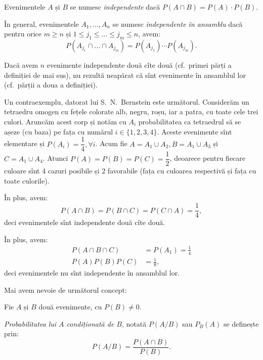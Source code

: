 \begin{definition}\label{def:ev-indep}
  Evenimentele $ A $ și $ B $ se numesc \emph{independente} dacă $ P(A \cap B) = P(A) \cdot P(B) $.

  În general, evenimentele $ A_1, \dots, A_n $ se numesc \emph{independente în ansamblu}
  dacă pentru orice $ m \geq n $ și $ 1 \leq j_1 \leq \dots \leq j_m \leq n $, avem:
  \[
    P(A_{j_1} \cap \dots \cap A_{j_m}) = P(A_{j_1}) \cdots P(A_{j_m}).
  \]
\end{definition}

\begin{remark}\label{rk:indep-ans}
  Dacă avem $ n $ evenimente independente două cîte două (cf.\ primei părți a definiției
  de mai sus), nu rezultă neapărat că sînt evenimente în ansamblul lor (cf.\ părții a
  doua a definiției).
\end{remark}

Un contraexemplu, datorat lui S.\ N.\ Bernstein este următorul. Considerăm un tetraedru
omogen cu fețele colorate alb, negru, roșu, iar a patra, cu toate cele trei culori.
Aruncăm acest corp și notăm cu $ A_i $ probabilitatea ca tetraedrul să se așeze (cu baza)
pe fața cu numărul $ i \in \{ 1, 2, 3, 4 \} $. Aceste evenimente sînt elementare și
$ P(A_i) = \dfrac{1}{4}, \forall i $. Acum fie $ A = A_1 \cup A_2, B = A_1 \cup A_3 $ și
$ C = A_1 \cup A_4 $. Atunci $ P(A) = P(B) = P(C) = \dfrac{1}{2} $, deoarece pentru fiecare
culoare sînt 4 cazuri posibile și 2 favorabile (fața cu culoarea respectivă și fața cu
toate culorile).

În plus, avem:
\[
  P(A \cap B) = P(B \cap C) = P(C \cap A) = \frac{1}{4},
\]
deci evenimentele sînt independente două cîte două.

În plus, avem:
\begin{align*}
  P(A \cap B \cap C) &= P(A_1) = \frac{1}{4} \\
  P(A)P(B)P(C) &= \frac{1}{8},
\end{align*}
deci evenimentele nu sînt independente în ansamblul lor.

\vspace{0.3cm}

Mai avem nevoie de următorul concept:

\begin{definition}\label{def:p-cond}
  Fie $ A $ și $ B $ două evenimente, cu $ P(B) \neq 0 $.

  \emph{Probabilitatea lui $ A $ condiționată de $ B $}, notată $ P(A/B) $ sau
  $ P_B(A) $ se definește prin:
  \[
    P(A/B) = \frac{P(A \cap B)}{P(B)}.
  \]
\end{definition}

